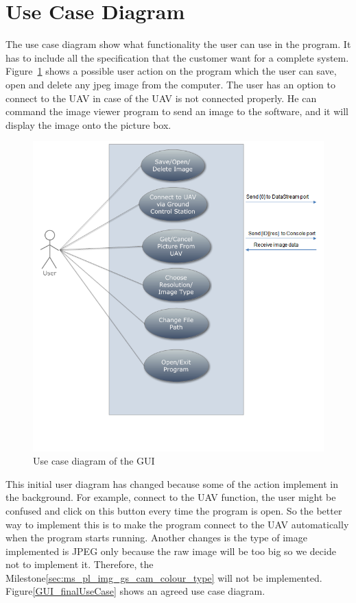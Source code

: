 \section{Use Case Diagram}
The use case diagram show what functionality the user can use in the program.
It has to include all the specification that the customer want for a complete system.
Figure~\ref{GUI_useCase} shows a possible user action on the program which the user can save, open and delete any jpeg image from the computer. 
The user has an option to connect to the UAV in case of the UAV is not connected properly.
He can command the image viewer program to send an image to the software, and it will display the image onto the picture box.
\begin{figure}[H]
\begin{center}
\includegraphics[scale=0.6]{figures/userCase.png} 
\end{center}
\caption{Use case diagram of the GUI\label{GUI_useCase}}
\end{figure}

This initial user diagram has changed because some of the action implement in the background. For example, connect to the UAV function, the user might be confused and click on this button every time the program is open. So the better way to implement this is to make the program connect to the UAV automatically when the program starts running. 
Another changes is the type of image implemented is JPEG only because the raw image will be too big so we decide not to implement it.
Therefore, the Milestone\ref{sec:ms_pl_img_gs_cam_colour_type} will not be implemented.
Figure\ref{GUI_finalUseCase} shows an agreed use case diagram. 

